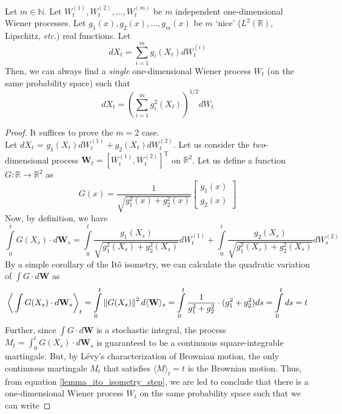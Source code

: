 \begin{lemma}
Let $m \in \mathbb{N}$. Let $W^{(1)}_t, W^{(2)}_t, \ldots, W^{(m)}_t$ be $m$ independent one-dimensional Wiener processes. Let $g_1(x), g_2(x), \ldots, g_m(x)$ be $m$ `nice' ($L^2(\mathbb{R})$, Lipschitz, \emph{etc}.) real functions. Let
\begin{equation*}
	dX_t = \sum\limits_{i=1}^{m} g_i(X_t)dW^{(i)}_t
\end{equation*}
Then, we can always find a \emph{single} one-dimensional Wiener process $W_t$ (on the same probability space) such that
\begin{equation*}
	dX_t = \left(\sum\limits_{i=1}^{m} g^2_i(X_t)\right)^{1/2}dW_t
\end{equation*}
\end{lemma}
\begin{proof}
It suffices to prove the $m=2$ case.\\
Let $dX_t$ = $g_1(X_t) dW^{(1)}_t + g_2(X_t)dW^{(2)}_t$. Let us consider the \emph{two}-dimensional process $\mathbf{W}_t = [W^{(1)}_t, W^{(2)}_t]^{\mathrm{T}}$ on $\mathbb{R}^2$. Let us define a function $G:\mathbb{R} \to \mathbb{R}^2$ as
\begin{equation}
\label{lemma_G_defn}
G(x) = \frac{1}{\sqrt{g_1^2(x) + g_2^2(x)}}\begin{bmatrix}g_1(x) \\ g_2(x)\end{bmatrix}
\end{equation}
Now, by definition, we have
\begin{equation}
	\label{lemma_G_integral}
\int\limits_{0}^{t}G(X_s) \cdot d\mathbf{W}_s = \int\limits_{0}^{t}\frac{g_1(X_s)}{\sqrt{g_1^2(X_s) + g_2^2(X_s)}} dW^{(1)}_t + \int\limits_{0}^{t}\frac{g_2(X_s)}{\sqrt{g_1^2(X_s) + g_2^2(X_s)}}dW^{(2)}_s
\end{equation}
By a simple corollary of the It\^o isometry, we can calculate the quadratic variation of $\int G \cdot d\mathbf{W}$ as
\begin{equation}
\bigg\langle \int\limits G(X_s) \cdot d\mathbf{W}_s \bigg\rangle_t = \int\limits_{0}^{t} \left\lVert G(X_s) \right\rVert^2 d \langle \mathbf{W} \rangle_s 
= \int\limits_{0}^{t}  \frac{1}{g_1^2 + g_2^2} \cdot (g_1^2 + g_2^2) ds = \int\limits_{0}^{t} ds  = t \label{lemma_ito_isometry_step}
\end{equation}
Further, since $\int G \cdot d\mathbf{W}$ is a stochastic integral, the process $M_t = \int_0^t G(X_s) \cdot d\mathbf{W}_s$ is guaranteed to be a continuous square-integrable martingale.  But, by L\'evy's characterization of Brownian motion, the only continuous martingale $M_t$ that satisfies $\langle M \rangle_t = t$ is the Brownian motion. Thus, from equation \eqref{lemma_ito_isometry_step}, we are led to conclude that there is a one-dimensional Wiener process $W_t$ on the same probability space such that we can write

\end{proof}
